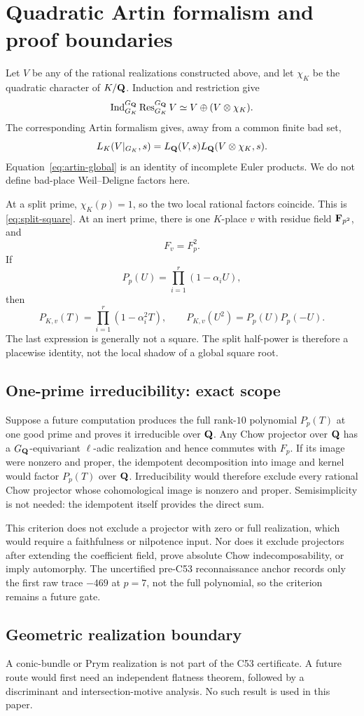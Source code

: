 \section{Quadratic Artin formalism and proof boundaries}
\label{sec:artin-scope}

Let \(V\) be any of the rational realizations constructed above, and let
\(\chi_K\) be the quadratic character of \(K/\mathbf Q\).  Induction and
restriction give
\[
\operatorname{Ind}_{G_K}^{G_\mathbf Q}\operatorname{Res}_{G_K}^{G_\mathbf Q}V
\simeq V\oplus(V\otimes\chi_K).
\]
The corresponding Artin formalism \cite[\S3, Proposition 3.8]{Deligne1973}
gives, away from a common finite bad set,
\begin{equation}
L_K(V|_{G_K},s)=L_\mathbf Q(V,s)L_\mathbf Q(V\otimes\chi_K,s).
\label{eq:artin-global}
\end{equation}
Equation~\eqref{eq:artin-global} is an identity of incomplete Euler
products.  We do not define bad-place Weil--Deligne factors here.

At a split prime, \(\chi_K(p)=1\), so the two local rational factors
coincide.  This is \eqref{eq:split-square}.  At an inert prime, there is
one \(K\)-place \(v\) with residue field \(\mathbf F_{p^2}\), and
\[
F_v=F_p^2.
\]
If
\[
P_p(U)=\prod_{i=1}^r(1-\alpha_iU),
\]
then
\begin{equation}
P_{K,v}(T)=\prod_{i=1}^r(1-\alpha_i^2T),
\qquad
P_{K,v}(U^2)=P_p(U)P_p(-U).
\label{eq:inert-rule}
\end{equation}
The last expression is generally not a square.  The split half-power is
therefore a placewise identity, not the local shadow of a global square
root.

\subsection{One-prime irreducibility: exact scope}

Suppose a future computation produces the full rank-\(10\) polynomial
\(P_p(T)\) at one good prime and proves it irreducible over \(\mathbf Q\).
Any Chow projector over \(\mathbf Q\) has a \(G_\mathbf Q\)-equivariant
\(\ell\)-adic realization and hence commutes with \(F_p\).  If its image
were nonzero and proper, the idempotent decomposition into image and
kernel would factor \(P_p(T)\) over \(\mathbf Q\).  Irreducibility would therefore
exclude every rational Chow projector whose cohomological image is
nonzero and proper.  Semisimplicity is not needed: the idempotent itself
provides the direct sum.

This criterion does not exclude a projector with zero or full realization,
which would require a faithfulness or nilpotence input.  Nor does it exclude
projectors after extending the coefficient field, prove absolute Chow
indecomposability, or imply automorphy.  The uncertified pre-C53
reconnaissance anchor records only the first raw trace \(-469\) at \(p=7\),
not the full polynomial, so the criterion remains a future gate.

\subsection{Geometric realization boundary}

A conic-bundle or Prym realization is not part of the C53 certificate.
A future route would first need an independent flatness theorem, followed
by a discriminant and intersection-motive analysis.  No such result is
used in this paper.
